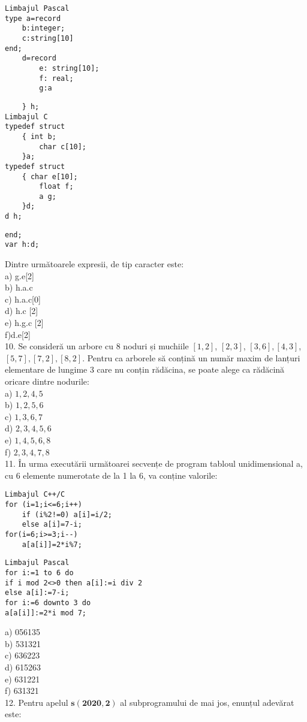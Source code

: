 \begin{verbatim}
Limbajul Pascal
type a=record
    b:integer;
    c:string[10]
end;
    d=record
        e: string[10];
        f: real;
        g:a
\end{verbatim}

\begin{verbatim}
    } h;
Limbajul C
typedef struct
    { int b;
        char c[10];
    }a;
typedef struct
    { char e[10];
        float f;
        a g;
    }d;
d h;
\end{verbatim}

\begin{verbatim}
end;
var h:d;
\end{verbatim}

Dintre următoarele expresii, de tip caracter este:\\[0pt]
a) g.e[2]\\
b) h.a.c\\[0pt]
c) h.a.c[0]\\[0pt]
d) h.c [2]\\[0pt]
e) h.g.c [2]\\[0pt]
f)d.e[2]\\
10. Se consideră un arbore cu 8 noduri și muchiile $[1,2]$, $[2,3]$, $[3,6],[4,3]$, $[5,7],[7,2],[8,2]$. Pentru ca arborele să conțină un număr maxim de lanțuri elementare de lungime 3 care nu conțin rădăcina, se poate alege ca rădăcină oricare dintre nodurile:\\
a) $1,2,4,5$\\
b) $1,2,5,6$\\
c) $1,3,6,7$\\
d) $2,3,4,5,6$\\
e) $1,4,5,6,8$\\
f) $2,3,4,7,8$\\
11. În urma executării următoarei secvențe de program tabloul unidimensional a, cu 6 elemente numerotate de la 1 la 6, va conține valorile:

\begin{verbatim}
Limbajul C++/C
for (i=1;i<=6;i++)
    if (i%2!=0) a[i]=i/2;
    else a[i]=7-i;
for(i=6;i>=3;i--)
    a[a[i]]=2*i%7;
\end{verbatim}

\begin{verbatim}
Limbajul Pascal
for i:=1 to 6 do
if i mod 2<>0 then a[i]:=i div 2
else a[i]:=7-i;
for i:=6 downto 3 do
a[a[i]]:=2*i mod 7;
\end{verbatim}

a) 056135\\
b) 531321\\
c) 636223\\
d) 615263\\
e) 631221\\
f) 631321\\
12. Pentru apelul $\mathbf{s}(\mathbf{2 0 2 0}, \mathbf{2})$ al subprogramului de mai jos, enunțul adevărat este:

